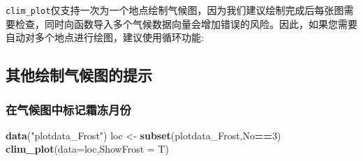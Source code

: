 \documentclass[
]{ctexart}
\newenvironment{Shaded}{\begin{snugshade}}{\end{snugshade}}
\newcommand{\AttributeTok}[1]{\textcolor[rgb]{0.13,0.29,0.53}{#1}}
\newcommand{\ConstantTok}[1]{\textcolor[rgb]{0.56,0.35,0.01}{#1}}
\newcommand{\ControlFlowTok}[1]{\textcolor[rgb]{0.13,0.29,0.53}{\textbf{#1}}}
\newcommand{\DecValTok}[1]{\textcolor[rgb]{0.00,0.00,0.81}{#1}}
\newcommand{\FunctionTok}[1]{\textcolor[rgb]{0.13,0.29,0.53}{\textbf{#1}}}
\newcommand{\NormalTok}[1]{#1}
\newcommand{\OtherTok}[1]{\textcolor[rgb]{0.56,0.35,0.01}{#1}}
\newcommand{\SpecialCharTok}[1]{\textcolor[rgb]{0.81,0.36,0.00}{\textbf{#1}}}
\newcommand{\StringTok}[1]{\textcolor[rgb]{0.31,0.60,0.02}{#1}}
\begin{document}
\texttt{clim\_plot}仅支持一次为一个地点绘制气候图，因为我们建议绘制完成后每张图需要检查，同时向函数导入多个气候数据向量会增加错误的风险。因此，如果您需要自动对多个地点进行绘图，建议使用循环功能:

\begin{Shaded}
\end{Shaded}

\hypertarget{ux5176ux4ed6ux7ed8ux5236ux6c14ux5019ux56feux7684ux63d0ux793a}{%
\subsection{其他绘制气候图的提示}\label{ux5176ux4ed6ux7ed8ux5236ux6c14ux5019ux56feux7684ux63d0ux793a}}

\hypertarget{ux5728ux6c14ux5019ux56feux4e2dux6807ux8bb0ux971cux51bbux6708ux4efd}{%
\subsubsection{在气候图中标记霜冻月份}\label{ux5728ux6c14ux5019ux56feux4e2dux6807ux8bb0ux971cux51bbux6708ux4efd}}

\begin{Shaded}
\begin{Highlighting}[]
\FunctionTok{data}\NormalTok{(}\StringTok{"plotdata\_Frost"}\NormalTok{)}
\NormalTok{loc }\OtherTok{\textless{}{-}} \FunctionTok{subset}\NormalTok{(plotdata\_Frost,No}\SpecialCharTok{==}\DecValTok{3}\NormalTok{)}
\FunctionTok{clim\_plot}\NormalTok{(}\AttributeTok{data=}\NormalTok{loc,}\AttributeTok{ShowFrost =}\NormalTok{ T)}
\end{Highlighting}
\end{Shaded}
\end{document}
